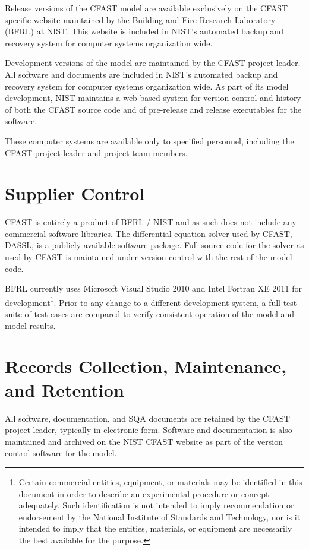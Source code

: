 Release versions of the CFAST model are available exclusively on the CFAST specific website maintained by the Building and Fire Research Laboratory (BFRL) at NIST. This website is included in NIST's automated backup and recovery system for computer systems organization wide.

Development versions of the model are maintained by the CFAST project leader.  All software and documents are included in NIST's automated backup and recovery system for computer systems organization wide. As part of its model development, NIST maintains a web-based system for version control and history of both the CFAST source code and of pre-release and release executables for the software.

These computer systems are available only to specified personnel, including the CFAST project leader and project team members.

\section{Supplier Control}

CFAST is entirely a product of BFRL / NIST and as such does not include any commercial software libraries. The differential equation solver used by CFAST, DASSL, is a publicly available software package.  Full source code for the solver as used by CFAST is maintained under version control with the rest of the model code.

BFRL currently uses Microsoft Visual Studio 2010 and Intel Fortran XE 2011 for development\footnote{Certain commercial entities, equipment, or materials may be identified in this document 
in order to describe an experimental procedure or concept adequately. Such identification 
is not intended to imply recommendation or endorsement by the National Institute of 
Standards and Technology, nor is it intended to imply that the entities, materials, or 
equipment are necessarily the best available for the purpose.}.  Prior to any change to a different development system, a full test suite of test cases are compared to verify consistent operation of the model and model results.

\section{Records Collection, Maintenance, and Retention}

All software, documentation, and SQA documents are retained by the CFAST project leader, typically in electronic form. Software and documentation is also maintained and archived on the NIST CFAST website as part of the version control software for the model. 

